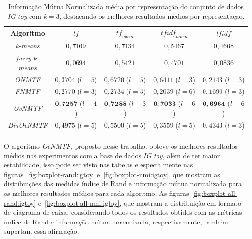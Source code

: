 \documentclass[
    12pt,                %
    oneside,            %
    a4paper,            %
    english,            %
    brazil                %
    ]{abntex2ppgsi}
\begin{document}
\begin{table}[H]
\centering
    \caption{Informação Mútua Normalizada média por representação do conjunto de dados \textit{IG toy} com $k = 3$, destacando os melhores resultados médios por representação.}
    \begin{tabular}{ccccc}
        \hline
        Algoritmo              & $\textit{tf}$ & $\textit{tf}_{norm}$ & $\textit{tfidf}_{norm}$ & $\textit{tfidf}$ \\
        \hline
        \textit{k-means}       & $0,7169$                    & $0,7134$                    & $0,5467$           & $0,4668$           \\
        \textit{fuzzy k-means} & $0,0694$                    & $0,5421$                    & $0,4701$           & $0,0836$           \\
        \textit{ONMTF}         & $0,3704$ ($l = 5$)          & $0,6720$ ($l = 5$)          & $0,6411$ ($l = 3$) & $0,2143$ ($l = 3$) \\
        \textit{FNMTF}         & $0,2770$ ($l = 3$)          & $0,2734$ ($l = 3$)          & $0,2039$ ($l = 6$) & $0,1690$ ($l = 3$) \\
        \textit{OvNMTF}        & $\mathbf{0,7257}$ ($l = 4$) & $\mathbf{0,7288}$ ($l = 3$) & $\mathbf{0,7033}$ ($l = 6$) & $\mathbf{0,6964}$ ($l = 6$) \\
        \textit{BinOvNMTF}     & $0,4975$ ($l = 5$)          & $0,5500$ ($l = 5$)          & $0,3559$ ($l = 5$) & $0,4343$ ($l = 3$) \\
        \hline \\
    \end{tabular}
    \label{tab:experiments-quant-nmi:igtoy}
\end{table}

O algoritmo \textit{OvNMTF}, proposto nesse trabalho, obteve os melhores resultados médios nos experimentos com a base de dados \textit{IG toy}, além de ter maior estabilidade, isso pode ser visto nas tabelas e especialmente nas figuras~\ref{fig:boxplot-rand:igtoy} e~\ref{fig:boxplot-nmi:igtoy}, que mostram as distribuições das medidas índice de Rand e informação mútua normalizada para os melhores resultados médios para cada algoritmo.
As figuras~\ref{fig:boxplot-all-rand:igtoy} e~\ref{fig:boxplot-all-nmi:igtoy}, que mostram a distribuição em formato de diagrama de caixa, considerando todos os resultados obtidos com as métricas índice de Rand e informação mútua normalizada, respectivamente, também suportam essa afirmação.
\end{document}
